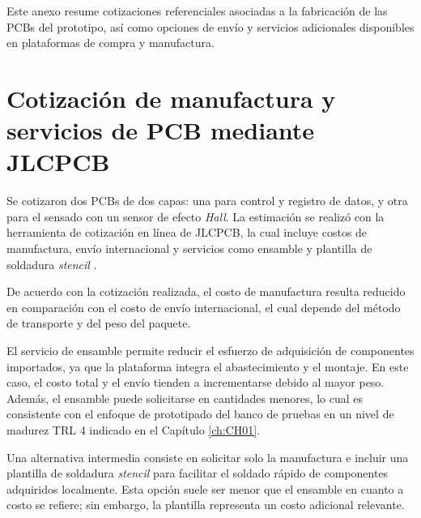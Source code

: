 Este anexo resume cotizaciones referenciales asociadas a la fabricación de las \ac{PCB}s del prototipo, así como opciones de envío y servicios adicionales disponibles en plataformas de compra y manufactura.

\section{Cotización de manufactura y servicios de \ac{PCB} mediante JLCPCB}

Se cotizaron dos \ac{PCB}s de dos capas: una para control y registro de datos, y otra para el sensado con un sensor de efecto \textit{Hall}. La estimación se realizó con la herramienta de cotización en línea de JLCPCB, la cual incluye costos de manufactura, envío internacional y servicios como ensamble y plantilla de soldadura \textit{stencil} \cite{jlcpcb_quote_es}.

De acuerdo con la cotización realizada, el costo de manufactura resulta reducido en comparación con el costo de envío internacional, el cual depende del método de transporte y del peso del paquete.

El servicio de ensamble permite reducir el esfuerzo de adquisición de componentes importados, ya que la plataforma integra el abastecimiento y el montaje. En este caso, el costo total y el envío tienden a incrementarse debido al mayor peso. Además, el ensamble puede solicitarse en cantidades menores, lo cual es consistente con el enfoque de prototipado del banco de pruebas en un nivel de madurez TRL 4 indicado en el Capítulo \ref{ch:CH01}.

Una alternativa intermedia consiste en solicitar solo la manufactura e incluir una plantilla de soldadura \textit{stencil} para facilitar el soldado rápido de componentes adquiridos localmente. Esta opción suele ser menor que el ensamble en cuanto a costo se refiere; sin embargo, la plantilla representa un costo adicional relevante.

